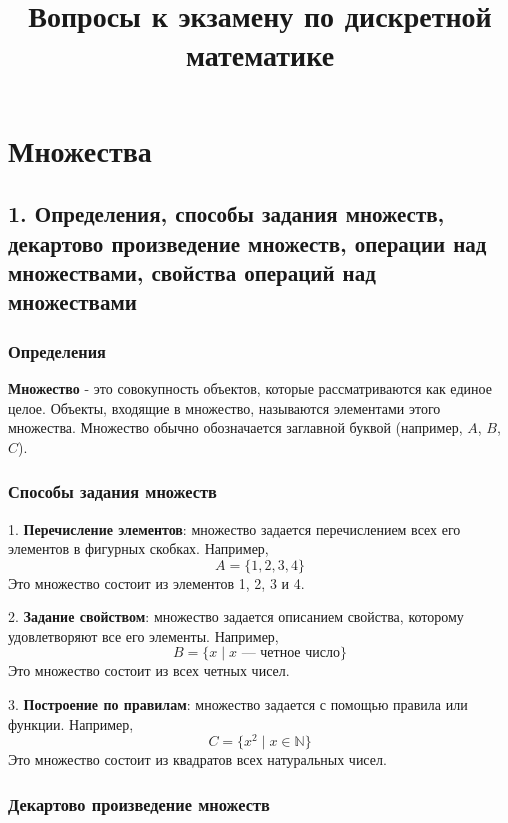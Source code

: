 \documentclass{article}
\begin{document}
\title{%
  \large Вопросы к экзамену по дискретной математике }
  \date{}
  \author{}
\maketitle

\section*{Множества} 

\subsection*{1. Определения, способы задания множеств, декартово произведение множеств, операции над множествами, свойства операций над множествами}

\subsubsection*{Определения}

\textbf{Множество} - это совокупность объектов, которые рассматриваются как единое целое. Объекты, входящие в множество, называются элементами этого множества. Множество обычно обозначается заглавной буквой (например, \( A \), \( B \), \( C \)).

\subsubsection*{Способы задания множеств}

1. \textbf{Перечисление элементов}: множество задается перечислением всех его элементов в фигурных скобках. Например,
   \[
   A = \{1, 2, 3, 4\}
   \]
   Это множество состоит из элементов 1, 2, 3 и 4.

2. \textbf{Задание свойством}: множество задается описанием свойства, которому удовлетворяют все его элементы. Например,
   \[
   B = \{x \mid x \text{ — четное число}\}
   \]
   Это множество состоит из всех четных чисел.

3. \textbf{Построение по правилам}: множество задается с помощью правила или функции. Например,
   \[
   C = \{x^2 \mid x \in \mathbb{N}\}
   \]
   Это множество состоит из квадратов всех натуральных чисел.
   
\subsubsection*{Декартово произведение множеств}
\end{document}
